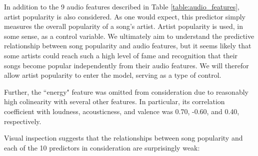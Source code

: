 \documentclass[12pt, twoside]{article}
\begin{document}
In addition to the 9 audio features described in Table \ref{table:audio_features}, artist popularity is also considered. As one would expect, this predictor simply measures the overall popularity of a song's artist. Artist popularity is used, in some sense, as a control variable. We ultimately aim to understand the predictive relationship between song popularity and audio features, but it seems likely that some artists could reach such a high level of fame and recognition that their songs become popular independently from their audio features. We will therefor allow artist popularity to enter the model, serving as a type of control.

Further, the ``energy" feature was omitted from consideration due to reasonably high colinearity with several other features. In particular, its correlation coefficient with loudness, acousticness, and valence was 0.70, -0.60, and 0.40, respectively. 

Visual inspection suggests that the relationships between song popularity and each of the 10 predictors in consideration are surprisingly weak:
\end{document}

